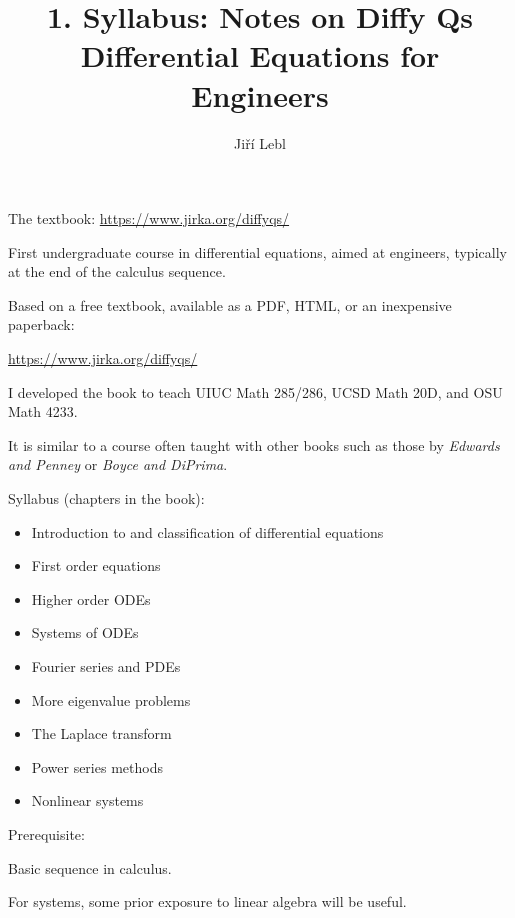 \documentclass[10pt,aspectratio=169]{beamer}
\author{Ji\v{r}\'i Lebl}
\institute[OSU]{%
Oklahoma State University%
}
\title{1. Syllabus: Notes on Diffy Qs\\Differential Equations for Engineers}
\date{}
\begin{document}
\begin{frame}
\titlepage


\begin{center}
The textbook: \url{https://www.jirka.org/diffyqs/}
\end{center}
\end{frame}

\begin{frame}
First undergraduate course in differential equations, aimed at engineers,
typically at the end of the calculus sequence.

\pause
\medskip

Based on a free textbook, available as a PDF, HTML, or an inexpensive
paperback:

\url{https://www.jirka.org/diffyqs/}

\pause
\medskip

I developed the book
to teach UIUC Math 285/286, UCSD Math 20D, and OSU Math 4233.

\pause
\medskip

It is similar to a course often taught with other books such as
those by
\emph{Edwards and Penney} or \emph{Boyce and DiPrima}.

\end{frame}

\begin{frame}
Syllabus (chapters in the book):

\begin{itemize}
\item\pause
Introduction to and classification of differential equations
\item\pause
First order equations
\item\pause
Higher order ODEs
\item\pause
Systems of ODEs
\item\pause
Fourier series and PDEs
\item\pause
More eigenvalue problems
\item\pause
The Laplace transform
\item\pause
Power series methods
\item\pause
Nonlinear systems
\end{itemize}
\end{frame}

\begin{frame}
Prerequisite:

\medskip

Basic sequence in calculus.

\medskip

For systems, some prior exposure to linear algebra will be useful.

\end{frame}
\end{document}

